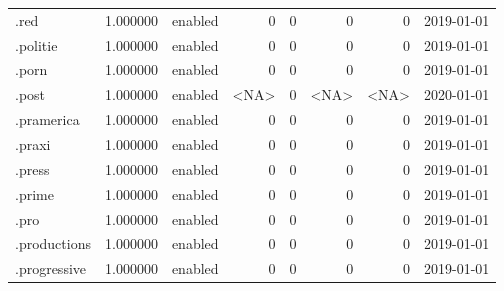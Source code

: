 \begin{tabular}{lrlrrrrl}
.red                      &          1.000000 &         enabled &                           0 &                           0 &                           0 &                   0 &           2019-01-01 \\
.politie                  &          1.000000 &         enabled &                           0 &                           0 &                           0 &                   0 &           2019-01-01 \\
.porn                     &          1.000000 &         enabled &                           0 &                           0 &                           0 &                   0 &           2019-01-01 \\
.post                     &          1.000000 &         enabled &                        <NA> &                           0 &                        <NA> &                <NA> &           2020-01-01 \\
.pramerica                &          1.000000 &         enabled &                           0 &                           0 &                           0 &                   0 &           2019-01-01 \\
.praxi                    &          1.000000 &         enabled &                           0 &                           0 &                           0 &                   0 &           2019-01-01 \\
.press                    &          1.000000 &         enabled &                           0 &                           0 &                           0 &                   0 &           2019-01-01 \\
.prime                    &          1.000000 &         enabled &                           0 &                           0 &                           0 &                   0 &           2019-01-01 \\
.pro                      &          1.000000 &         enabled &                           0 &                           0 &                           0 &                   0 &           2019-01-01 \\
.productions              &          1.000000 &         enabled &                           0 &                           0 &                           0 &                   0 &           2019-01-01 \\
.progressive              &          1.000000 &         enabled &                           0 &                           0 &                           0 &                   0 &           2019-01-01 \\

\end{tabular}
